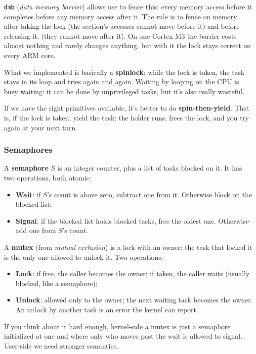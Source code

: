 \documentclass[a4paper,11pt]{article}
\begin{document}
\texttt{dmb} (\textit{data memory barrier}) allows use to fence this: every memory access before it completes before any memory access after it.
The rule is to fence on memory after taking the lock (the section's accesses cannot move before it) and before releasing it. (they cannot move after it).
On one Cortex-M3 the barrier costs almost nothing and rarely changes anything, but with it the lock stays correct on every ARM core.

\par\smallskip

What we implemented is basically a \textbf{spinlock}: while the lock is taken, the task stays in its loop and tries again and again.
Waiting by looping on the CPU is busy waiting: it can be done by unprivileged tasks, but it's also really wasteful.

If we have the right primitives available, it's better to do \textbf{spin-then-yield}.
That is, if the lock is taken, yield the task: the holder runs, frees the lock, and you try again at your next turn.

\subsubsection{Semaphores}

A \textbf{semaphore} $S$ is an integer counter, plus a list of tasks blocked on it. It has two operations, both atomic:
\begin{itemize}
	\item \textbf{Wait}: if $S$'s count is above zero, subtract one from it. Otherwise block on the blocked list;
	\item \textbf{Signal}: if the blocked list holds blocked tasks, free the oldest one. Otherwise add one from $S$'s count.
\end{itemize}

\par\smallskip

A \textbf{mutex} (from \textit{mutual exclusion}) is a lock with an owner: the task that locked it is the only one allowed to unlock it.
Two operations:
\begin{itemize}
	\item \textbf{Lock}: if free, the caller becomes the owner; if taken, the caller waits (usually blocked, like a semaphore);
	\item \textbf{Unlock}: allowed only to the owner; the next waiting task becomes the owner. An unlock by another task is an error the kernel can report.
\end{itemize}

If you think about it hard enough, kernel-side a mutex is just a semaphore initialized at one and where only who moves past the wait is allowed to signal.
User-side we need stronger semantics.
\end{document}
